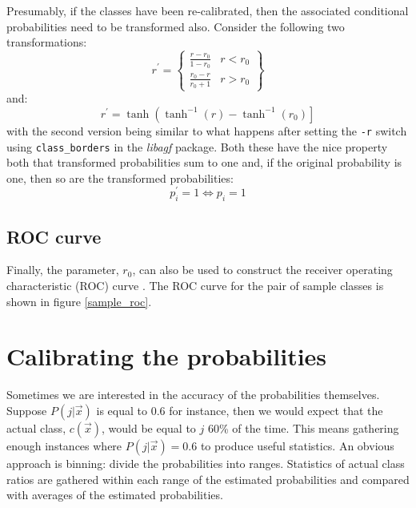 \documentclass{article}
\begin{document}
Presumably, if the classes have been re-calibrated, then the associated 
conditional probabilities need to be transformed also.
Consider the following two transformations:
\begin{equation}
r^\prime = \left \lbrace
\begin{array}{lr}
\frac{r-r_0}{1-r_0} & r<r_0 \\
\frac{r_0-r}{r_0+1} & r>r_0
\end{array} \right \rbrace
\end{equation}
and:
\begin{equation}
r^\prime=\tanh \left (\tanh^{-1}(r)-\tanh^{-1}(r_0) \right ]
\end{equation}
with the second version being similar to what happens after setting the 
\verb/-r/ switch using \verb/class_borders/ in the {\it libagf} package.
Both these have the nice property both that transformed probabilities sum
to one and, if the original probability is one, then so are the transformed
probabilities:
\begin{equation}
p_i^\prime=1 \iff p_i=1
\label{ptop}
\end{equation}

\subsection{ROC curve}

Finally, the parameter, $r_0$, can also be used to construct 
the receiver operating characteristic (ROC) curve \citep{Jolliffe_Stephenson2003}.
The ROC curve for the pair of sample classes is shown in figure
\ref{sample_roc}.

\section{Calibrating the probabilities}

Sometimes we are interested in the accuracy of the probabilities themselves.
Suppose $P(j|\vec x)$ is equal to 0.6 for instance, then we would expect
that the actual class, $c(\vec x)$, would be equal to $j$ 60\% of the time.
This means gathering enough instances where $P(j|\vec x)=0.6$ to produce
useful statistics.
An obvious approach is binning: divide the probabilities into ranges.
Statistics of actual class ratios are gathered within each range of the estimated
probabilities and compared with averages of the estimated probabilities.


 
\end{document}
